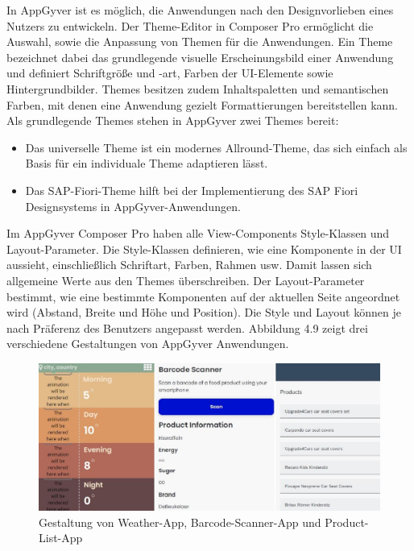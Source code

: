 In AppGyver ist es möglich, die Anwendungen nach den Designvorlieben eines Nutzers zu entwickeln. Der Theme-Editor in Composer Pro ermöglicht die Auswahl, sowie die Anpassung von Themen für die Anwendungen. Ein Theme bezeichnet dabei das grundlegende visuelle Erscheinungsbild einer Anwendung und definiert Schriftgröße und -art, Farben der UI-Elemente sowie Hintergrundbilder\cite{hel:the}. Themes besitzen zudem Inhaltspaletten und semantischen Farben, mit denen eine Anwendung gezielt Formattierungen bereitstellen kann\cite{appg:the}. Als grundlegende Themes stehen in AppGyver zwei Themes bereit: 

\begin{itemize}[noitemsep]
\item Das universelle Theme ist ein modernes Allround-Theme, das sich einfach als Basis für ein individuale Theme adaptieren lässt.
\item Das SAP-Fiori-Theme hilft bei der Implementierung des SAP Fiori Designsystems in AppGyver-Anwendungen\cite{har:new}.
\end{itemize}

Im AppGyver Composer Pro haben alle View-Components Style-Klassen und Layout-Parameter. Die Style-Klassen definieren, wie eine Komponente in der UI aussieht, einschließlich Schriftart, Farben, Rahmen usw. Damit lassen sich allgemeine Werte aus den Themes überschreiben. Der Layout-Parameter bestimmt, wie eine bestimmte Komponenten auf der aktuellen Seite angeordnet wird (Abstand, Breite und Höhe und Position). Die Style und Layout können je nach Präferenz des Benutzers angepasst werden. Abbildung 4.9 zeigt drei verschiedene Gestaltungen von AppGyver Anwendungen.

\begin{figure}[htbp]
 \centering
 \includegraphics[width=1.0\textwidth]{Bilder/appgyver/4_9_1_gestaltung.jpg}
 \caption{Gestaltung von Weather-App, Barcode-Scanner-App und Product-List-App}
\end{figure}

